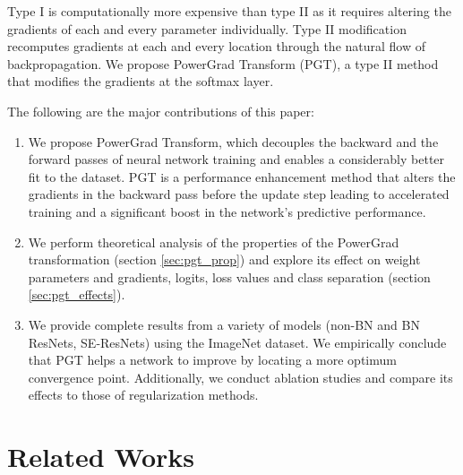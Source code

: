 \documentclass[runningheads]{llncs}
\begin{document}
Type I is computationally more expensive than type II as it requires altering the
gradients of each and every parameter individually. Type II modification recomputes
gradients at each and every location through the natural flow of backpropagation. We
propose PowerGrad Transform (PGT), a type II method that modifies the gradients at the
softmax layer.




The following are the major contributions of this paper:

\begin{enumerate}

\item We propose PowerGrad Transform, which decouples the backward and the forward
passes of neural network training and enables a considerably better fit to the dataset.
PGT is a performance enhancement method that alters the gradients in the backward pass
before the update step leading to accelerated training and a significant boost in the
network's predictive performance.

\item We perform theoretical analysis of the properties of the PowerGrad transformation
(section \ref{sec:pgt_prop}) and explore its effect on weight parameters and gradients,
logits, loss values and class separation (section \ref{sec:pgt_effects}).

\item We provide complete results from a variety of models (non-BN and BN ResNets,
SE-ResNets) using the ImageNet dataset. We empirically conclude that PGT helps a network
to improve by locating a more optimum convergence point. Additionally, we conduct
ablation studies and compare its effects to those of regularization methods.

\end{enumerate}

\section{Related Works}
\label{sec:Rela}
\end{document}
